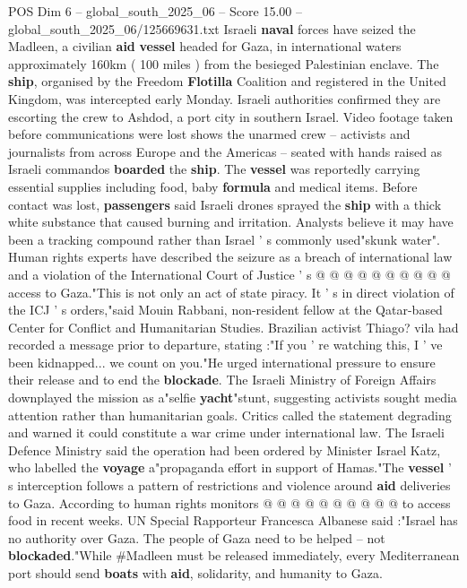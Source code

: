 \begin{textsample}{POS Dim 6 – global\_south\_2025\_06 – Score 15.00 – global\_south\_2025\_06/125669631.txt}  \label{ex:f6_pos_011}
Israeli \textbf{naval} forces have seized the Madleen, a civilian \textbf{aid} \textbf{vessel} headed for Gaza, in international waters approximately 160km ( 100 miles ) from the besieged Palestinian enclave.
The \textbf{ship}, organised by the Freedom \textbf{Flotilla} Coalition and registered in the United Kingdom, was intercepted early Monday.
Israeli authorities confirmed they are escorting the crew to Ashdod, a port city in southern Israel.
Video footage taken before communications were lost shows the unarmed crew -- activists and journalists from across Europe and the Americas -- seated with hands raised as Israeli commandos \textbf{boarded} the \textbf{ship}.
The \textbf{vessel} was reportedly carrying essential supplies including food, baby \textbf{formula} and medical items.
Before contact was lost, \textbf{passengers} said Israeli drones sprayed the \textbf{ship} with a thick white substance that caused burning and irritation.
Analysts believe it may have been a tracking compound rather than Israel ' s commonly used"skunk water".
Human rights experts have described the seizure as a breach of international law and a violation of the International Court of Justice ' s @ @ @ @ @ @ @ @ @ @ access to Gaza."This is not only an act of state piracy.
It ' s in direct violation of the ICJ ' s orders,"said Mouin Rabbani, non-resident fellow at the Qatar-based Center for Conflict and Humanitarian Studies.
Brazilian activist Thiago? vila had recorded a message prior to departure, stating :"If you ' re watching this, I ' ve been kidnapped... we count on you."He urged international pressure to ensure their release and to end the \textbf{blockade}.
The Israeli Ministry of Foreign Affairs downplayed the mission as a"selfie \textbf{yacht}"stunt, suggesting activists sought media attention rather than humanitarian goals.
Critics called the statement degrading and warned it could constitute a war crime under international law.
The Israeli Defence Ministry said the operation had been ordered by Minister Israel Katz, who labelled the \textbf{voyage} a"propaganda effort in support of Hamas."The \textbf{vessel} ' s interception follows a pattern of restrictions and violence around \textbf{aid} deliveries to Gaza.
According to human rights monitors @ @ @ @ @ @ @ @ @ @ to access food in recent weeks.
UN Special Rapporteur Francesca Albanese said :"Israel has no authority over Gaza.
The people of Gaza need to be helped -- not \textbf{blockaded}."While \#Madleen must be released immediately, every Mediterranean port should send \textbf{boats} with \textbf{aid}, solidarity, and humanity to Gaza.

\end{textsample}

